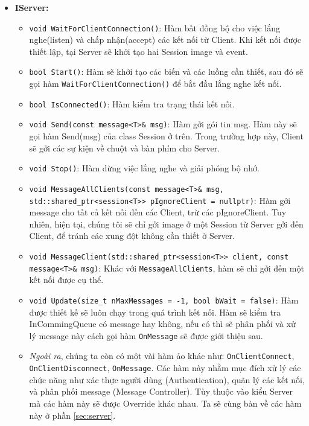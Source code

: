 \begin{itemize}
	\item \textbf{IServer: } 
	\begin{itemize}
		\item[] \lstinline{void WaitForClientConnection()}: Hàm bất đồng bộ cho việc lắng nghe(listen) và chấp nhận(accept) các kết nối từ Client. Khi kết nối được thiết lập, tại Server sẽ khởi tạo hai Session image và event.
		\item[] \lstinline{bool Start()}: Hàm sẽ khởi tạo các biến và các luồng cần thiết, sau đó sẽ gọi hàm \lstinline{WaitForClientConnection()} để bắt đầu lắng nghe kết nối.
		\item[] \lstinline{bool IsConnected()}: Hàm kiểm tra trạng thái kết nối.
		\item[] \lstinline{void Send(const message<T>& msg)}: Hàm gởi gói tin msg. Hàm này sẽ gọi hàm Send(msg) của class Session ở trên. Trong trường hợp này, Client sẽ gởi các sự kiện về chuột và bàn phím cho Server.
		\item[] \lstinline{void Stop()}: Hàm dừng việc lắng nghe và giải phóng bộ nhớ.
		\item[] \lstinline{void MessageAllClients(const message<T>& msg, std::shared_ptr<session<T>> pIgnoreClient = nullptr)}: Hàm gởi message cho tất cả kết nối đến các Client, trừ các pIgnoreClient. Tuy nhiên, hiện tại, chúng tôi sẽ chỉ gởi image ở một Session từ Server gởi đến Client, để tránh các xung đột không cần thiết ở Server.
		\item[] \lstinline{void MessageClient(std::shared_ptr<session<T>> client, const message<T>& msg)}: Khác với \lstinline{MessageAllClients}, hàm sẽ chỉ gởi đến một kết nối được cụ thể.
		\item[] \lstinline{void Update(size_t nMaxMessages = -1, bool bWait = false)}: Hàm được thiết kế sẽ luôn chạy trong quá trình kết nối. Hàm sẽ kiểm tra InCommingQueue có message hay không, nếu có thì sẽ phân phối và xử lý message này cách gọi hàm \lstinline{OnMessage} sẽ được giới thiệu sau.
		
		\item[] \textit{Ngoài ra}, chúng ta còn có một vài hàm ảo khác như: \lstinline{OnClientConnect}, \\ \lstinline{OnClientDisconnect}, \lstinline{OnMessage}. Các hàm này nhằm mục đích xử lý các chức năng như xác thực người dùng (Authentication), quãn lý các kết nối, và phân phối message (Message Controller). Tùy thuộc vào kiểu Server mà các hàm này sẽ được Override khác nhau. Ta sẽ cùng bàn về các hàm này ở phần \ref{sec:server}.
		
	\end{itemize}
\end{itemize}

